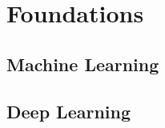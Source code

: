 \chapter{Foundations}

\blindtext[1]

\section{Machine Learning}

\Blindtext[4][1]

\section{Deep Learning}

\Blindtext[4][1]
